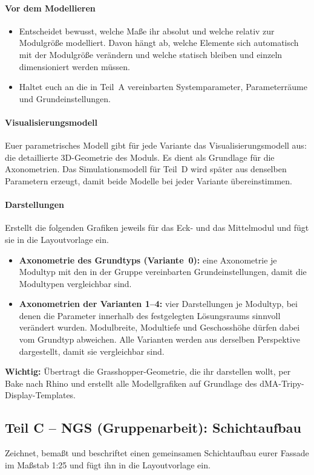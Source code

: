\paragraph{Vor dem Modellieren}
\begin{itemize}
  \item Entscheidet bewusst, welche Maße ihr absolut und welche relativ zur Modulgröße modelliert. Davon hängt ab, welche Elemente sich automatisch mit der Modulgröße verändern und welche statisch bleiben und einzeln dimensioniert werden müssen.
  \item Haltet euch an die in Teil~A vereinbarten Systemparameter, Parameterräume und Grundeinstellungen.
\end{itemize}
\paragraph{Visualisierungsmodell}
Euer parametrisches Modell gibt für jede Variante das Visualisierungsmodell aus: die detaillierte 3D-Geometrie des Moduls. Es dient als Grundlage für die Axonometrien. Das Simulationsmodell für Teil~D wird später aus denselben Parametern erzeugt, damit beide Modelle bei jeder Variante übereinstimmen.
\paragraph{Darstellungen}
Erstellt die folgenden Grafiken jeweils für das Eck- und das Mittelmodul und fügt sie in die Layoutvorlage ein.
\begin{itemize}
  \item \textbf{Axonometrie des Grundtyps (Variante~0):} eine Axonometrie je Modultyp mit den in der Gruppe vereinbarten Grundeinstellungen, damit die Modultypen vergleichbar sind.
  \item \textbf{Axonometrien der Varianten 1–4:} vier Darstellungen je Modultyp, bei denen die Parameter innerhalb des festgelegten Lösungsraums sinnvoll verändert wurden. Modulbreite, Modultiefe und Geschosshöhe dürfen dabei vom Grundtyp abweichen. Alle Varianten werden aus derselben Perspektive dargestellt, damit sie vergleichbar sind.
\end{itemize}
\textbf{Wichtig:} Übertragt die Grasshopper-Geometrie, die ihr darstellen wollt, per Bake nach Rhino und erstellt alle Modellgrafiken auf Grundlage des dMA-Tripy-Display-Templates.
\subsection{Teil C – NGS (Gruppenarbeit): Schichtaufbau}
Zeichnet, bemaßt und beschriftet einen gemeinsamen Schichtaufbau eurer Fassade im Maßstab 1:25 und fügt ihn in die Layoutvorlage ein.

